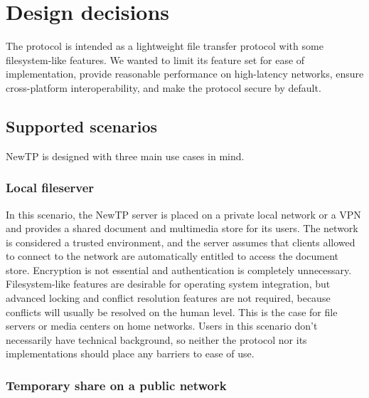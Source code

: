 
\section{Design decisions}

The protocol is intended as a lightweight file transfer protocol with some filesystem-like features. We wanted
to limit its feature set for ease of implementation, provide reasonable performance on high-latency networks,
ensure cross-platform interoperability, and make the protocol secure by default.

%

\subsection{Supported scenarios}

NewTP is designed with three main use cases in mind.

%

\subsubsection{Local fileserver}

In this scenario, the NewTP server is placed on a private local network or a VPN and provides a shared
document and multimedia store for its users. The network is considered a trusted environment, and the server
assumes that clients allowed to connect to the network are automatically entitled to access the document
store.  Encryption is not essential and authentication is completely unnecessary. Filesystem-like features are
desirable for operating system integration, but advanced locking and conflict resolution features are not
required, because conflicts will usually be resolved on the human level. This is the case for file servers or
media centers on home networks. Users in this scenario don't necessarily have technical background, so neither
the protocol nor its implementations should place any barriers to ease of use.

%

\subsubsection{Temporary share on a public network}

